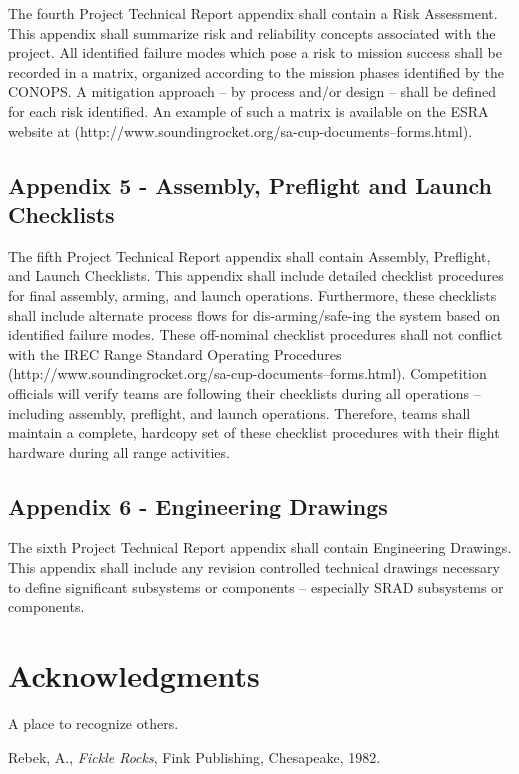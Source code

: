 \documentclass[]{aiaa-tc}%
\begin{document}
The fourth Project Technical Report appendix shall contain a Risk Assessment. This appendix shall summarize risk and reliability concepts associated with the project. All identified failure modes which pose a risk to mission success shall be recorded in a matrix, organized according to the mission phases identified by the CONOPS. A mitigation approach – by process and/or design – shall be defined for each risk identified. An example of such a matrix is available on the ESRA website at (http://www.soundingrocket.org/sa-cup-documents--forms.html).

\clearpage
\subsection*{Appendix 5 - Assembly, Preflight and Launch Checklists}

The fifth Project Technical Report appendix shall contain Assembly, Preflight, and Launch Checklists. This appendix shall include detailed checklist procedures for final assembly, arming, and launch operations. Furthermore, these checklists shall include alternate process flows for dis-arming/safe-ing the system based on identified failure modes. These off-nominal checklist procedures shall not conflict with the IREC Range Standard Operating Procedures (http://www.soundingrocket.org/sa-cup-documents--forms.html).
Competition officials will verify teams are following their checklists during all operations – including assembly, preflight, and launch operations. Therefore, teams shall maintain a complete, hardcopy set of these checklist procedures with their flight hardware during all range activities.


\clearpage
\subsection*{Appendix 6 - Engineering Drawings}

The sixth Project Technical Report appendix shall contain Engineering Drawings. This appendix shall include any revision controlled technical drawings necessary to define significant subsystems or components – especially SRAD subsystems or components.

\section*{Acknowledgments}

A place to recognize others.

\begin{thebibliography}{9}%
 Rebek, A., {\it Fickle Rocks}, Fink Publishing, Chesapeake, 1982.
\end{thebibliography}
\end{document}
